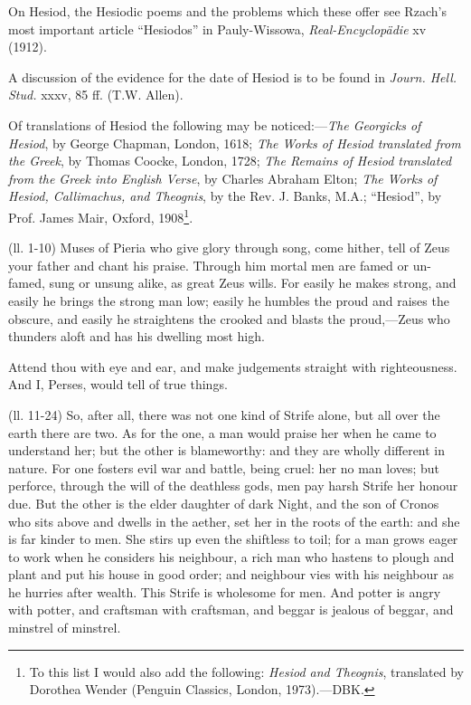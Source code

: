 On Hesiod, the Hesiodic poems and the problems which these offer see
Rzach’s most important article “Hesiodos” in Pauly-Wissowa,
\emph{Real-Encyclopädie} xv (1912).

A discussion of the evidence for the date of Hesiod is to be found in
\emph{Journ. Hell. Stud.} xxxv, 85 ff. (T.W. Allen).

Of translations of Hesiod the following may be noticed:—\emph{The Georgicks
of Hesiod}, by George Chapman, London, 1618; \emph{The Works of Hesiod
translated from the Greek}, by Thomas Coocke, London, 1728; \emph{The Remains
of Hesiod translated from the Greek into English Verse}, by Charles Abraham
Elton; \emph{The Works of Hesiod, Callimachus, and Theognis}, by the Rev. J.
Banks, M.A.; “Hesiod”, by Prof. James Mair, Oxford, 1908\footnote{To this list I would also
add the following: \emph{Hesiod and Theognis}, translated by Dorothea Wender
(Penguin Classics, London, 1973).—DBK.}.



(ll. 1-10) Muses of Pieria who give glory through song, come hither, tell of
Zeus your father and chant his praise. Through him mortal men are famed or
un-famed, sung or unsung alike, as great Zeus wills. For easily he makes
strong, and easily he brings the strong man low; easily he humbles the proud
and raises the obscure, and easily he straightens the crooked and blasts the
proud,—Zeus who thunders aloft and has his dwelling most high.

Attend thou with eye and ear, and make judgements straight with righteousness.
And I, Perses, would tell of true things.

(ll. 11-24) So, after all, there was not one kind of Strife alone, but all over
the earth there are two. As for the one, a man would praise her when he came to
understand her; but the other is blameworthy: and they are wholly different in
nature. For one fosters evil war and battle, being cruel: her no man loves; but
perforce, through the will of the deathless gods, men pay harsh Strife her
honour due. But the other is the elder daughter of dark Night, and the son of
Cronos who sits above and dwells in the aether, set her in the roots of the
earth: and she is far kinder to men. She stirs up even the shiftless to toil;
for a man grows eager to work when he considers his neighbour, a rich man who
hastens to plough and plant and put his house in good order; and neighbour vies
with his neighbour as he hurries after wealth. This Strife is wholesome for
men. And potter is angry with potter, and craftsman with craftsman, and beggar
is jealous of beggar, and minstrel of minstrel.


